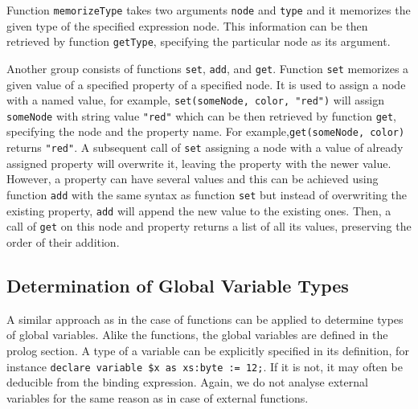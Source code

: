 Function \texttt{memorizeType} takes two arguments \texttt{node} and \texttt{type} and it memorizes the given type of the specified expression node. This information can be then retrieved by function \texttt{getType}, specifying the particular node as its argument.

Another group consists of functions \texttt{set}, \texttt{add}, and \texttt{get}. Function \texttt{set} memorizes a given value of a specified property of a specified node. It is used to assign a node with a named value, for example, \texttt{set(someNode, color, "red")} will assign \texttt{someNode} with string value \texttt{"red"} which can be then retrieved by function \texttt{get}, specifying the node and the property name. For example,\linebreak \texttt{get(someNode, color)} returns \texttt{"red"}. A subsequent call of \texttt{set} assigning a node with a value of already assigned property will overwrite it, leaving the property with the newer value. However, a property can have several values and this can be achieved using function \texttt{add} with the same syntax as function \texttt{set} but instead of overwriting the existing property, \texttt{add} will append the new value to the existing ones. Then, a call of \texttt{get} on this node and property returns a list of all its values, preserving the order of their addition.

\subsection{Determination of Global Variable Types}
A similar approach as in the case of functions can be applied to determine types of global variables. Alike the functions, the global variables are defined in the prolog section. A type of a variable can be explicitly specified in its definition, for instance \texttt{declare variable \$x as xs:byte := 12;}. If it is not, it may often be deducible from the binding expression. Again, we do not analyse external variables for the same reason as in case of external functions.

